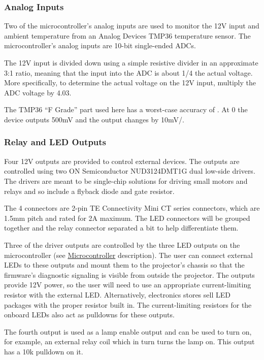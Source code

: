\documentclass{article}
\begin{document}
\subsubsection{Analog Inputs} \label{sssec:AnalogIn}
Two of the microcontroller's analog inputs are used to monitor the 12V input and ambient temperature
from an Analog Devices TMP36 temperature sensor.  The microcontroller's analog inputs are 10-bit
single-ended ADCs.

The 12V input is divided down using a simple resistive divider in an approximate 3:1 ratio, meaning that the
input into the ADC is about 1/4 the actual voltage.  More specifically, to determine the actual
voltage on the 12V input, multiply the ADC voltage by 4.03.

The TMP36 ``F Grade'' part used here has a worst-case accuracy of \textcelsius{}.  At
0\textcelsius{} the device outputs 500mV and the output changes by 10mV/\textcelsius{}.

\subsubsection{Relay and LED Outputs} \label{sssec:RelayLED} 
Four 12V outputs are provided to control external devices.  The outputs are controlled using two ON
Semiconductor NUD3124DMT1G dual low-side drivers.  The drivers are meant to be single-chip solutions
for driving small motors and relays and so include a flyback diode and gate resistor.

The 4 connectors are 2-pin TE Connectivity Mini CT series connectors, which are 1.5mm pitch and
rated for 2A maximum.  The LED connectors will be grouped together and the relay connector separated
a bit to help differentiate them.

Three of the driver outputs are controlled by the three LED outputs on the microcontroller (see
\hyperref[sssec:Microcontroller]{Microcontroller} description).  The user can connect external LEDs
to these outputs and mount them to the projector's chassis so that the firmware's diagnostic
signaling is visible from outside the projector.  The outputs provide 12V power, so the user will
need to use an appropriate current-limiting resistor with the external LED.  Alternatively,
electronics stores sell LED packages with the proper resistor built in.  The current-limiting
resistors for the onboard LEDs also act as pulldowns for these outputs.

The fourth output is used as a lamp enable output and can be used to turn on, for example, an
external relay coil which in turn turns the lamp on.  This output has a 10k pulldown on it.
\end{document}
